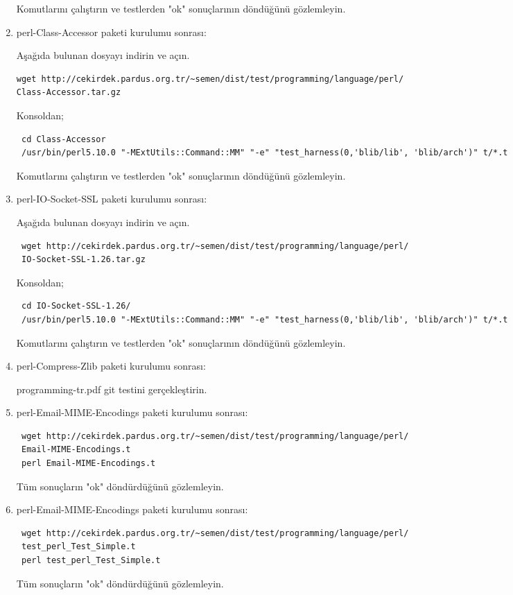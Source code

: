 \documentclass[a4paper,10pt]{article}
\begin{document}
\begin{enumerate}
Komutlarını çalıştırın ve testlerden "ok" sonuçlarının döndüğünü gözlemleyin.

\item perl-Class-Accessor paketi kurulumu sonrası:

Aşağıda bulunan dosyayı indirin ve açın.
\begin{verbatim}
wget http://cekirdek.pardus.org.tr/~semen/dist/test/programming/language/perl/
Class-Accessor.tar.gz
\end{verbatim}

Konsoldan;
\begin{verbatim}
 cd Class-Accessor
 /usr/bin/perl5.10.0 "-MExtUtils::Command::MM" "-e" "test_harness(0,'blib/lib', 'blib/arch')" t/*.t
\end{verbatim}

Komutlarını çalıştırın ve testlerden "ok" sonuçlarının döndüğünü gözlemleyin.


\item perl-IO-Socket-SSL paketi kurulumu sonrası:

Aşağıda bulunan dosyayı indirin ve açın.
\begin{verbatim}
 wget http://cekirdek.pardus.org.tr/~semen/dist/test/programming/language/perl/
 IO-Socket-SSL-1.26.tar.gz
\end{verbatim}

Konsoldan;
\begin{verbatim}
 cd IO-Socket-SSL-1.26/
 /usr/bin/perl5.10.0 "-MExtUtils::Command::MM" "-e" "test_harness(0,'blib/lib', 'blib/arch')" t/*.t
\end{verbatim}

Komutlarını çalıştırın ve testlerden "ok" sonuçlarının döndüğünü gözlemleyin.
\item perl-Compress-Zlib paketi kurulumu sonrası:

programming-tr.pdf git testini gerçekleştirin.

\item perl-Email-MIME-Encodings paketi kurulumu sonrası:
\begin{verbatim}
 wget http://cekirdek.pardus.org.tr/~semen/dist/test/programming/language/perl/
 Email-MIME-Encodings.t
 perl Email-MIME-Encodings.t
\end{verbatim}

Tüm sonuçların "ok" döndürdüğünü gözlemleyin. 

\item perl-Email-MIME-Encodings paketi kurulumu sonrası:
\begin{verbatim}
 wget http://cekirdek.pardus.org.tr/~semen/dist/test/programming/language/perl/
 test_perl_Test_Simple.t
 perl test_perl_Test_Simple.t
\end{verbatim}

Tüm sonuçların "ok" döndürdüğünü gözlemleyin. 


\end{enumerate}
\end{document}
